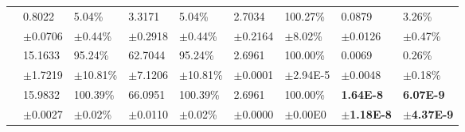 \documentclass{article}
\begin{document}
\begin{table}[H]
{\begin{tabularx}{1.2\textwidth}{cXXXXXXXX}
        \cline{2-9}\rule{0pt}{2.3ex}

        \multirow{2}{*}{Baseline$_{\alpha=1}$} 
        & 0.8022 & 5.04\% & 3.3171 & 5.04\% & 2.7034 & 100.27\% & 0.0879 & 3.26\% \\
        &\scriptsize$\pm$0.0706 &\scriptsize$\pm$0.44\% &\scriptsize$\pm$0.2918 &\scriptsize$\pm$0.44\% &\scriptsize$\pm$0.2164 &\scriptsize$\pm$8.02\% &\scriptsize$\pm$0.0126 &\scriptsize$\pm$0.47\% \\

        \cline{2-9}\rule{0pt}{2.3ex}

        \multirow{2}{*}{Baseline$_{\alpha=10}$} 
        & 15.1633 & 95.24\% & 62.7044 & 95.24\% & 2.6961 & 100.00\% & 0.0069 & 0.26\% \\
        &\scriptsize$\pm$1.7219 &\scriptsize$\pm$10.81\% &\scriptsize$\pm$7.1206 &\scriptsize$\pm$10.81\% &\scriptsize$\pm$0.0001 &\scriptsize$\pm$2.94E-5 &\scriptsize$\pm$0.0048 &\scriptsize$\pm$0.18\% \\

        \cline{2-9}\rule{0pt}{2.3ex}

        \multirow{2}{*}{Baseline$_{\alpha=100}$}
        & 15.9832 & 100.39\% & 66.0951 & 100.39\% & 2.6961 & 100.00\% & \textbf{1.64E-8} & \textbf{6.07E-9} \\
        &\scriptsize$\pm$0.0027 &\scriptsize$\pm$0.02\% &\scriptsize$\pm$0.0110 &\scriptsize$\pm$0.02\% &\scriptsize$\pm$0.0000 &\scriptsize$\pm$0.00E0 &\scriptsize\textbf{$\pm$1.18E-8} &\scriptsize\textbf{$\pm$4.37E-9} \\
        

\end{tabularx}}
\end{table}
\end{document}
